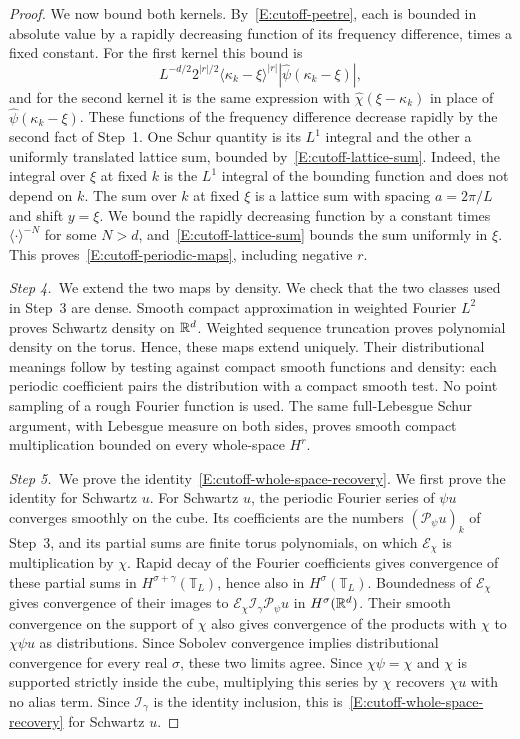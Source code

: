 \begin{proof}
  We now bound both kernels. By~\eqref{E:cutoff-peetre}, each is bounded in
  absolute value by a rapidly decreasing function of its frequency difference,
  times a fixed constant. For the first kernel this bound is
  \[
    L^{-d/2}2^{|r|/2}\langle\kappa_k-\xi\rangle^{|r|}
    \left|\widehat{\psi}(\kappa_k-\xi)\right|,
  \]
  and for the second kernel it is the same expression with
  $\widehat{\chi}(\xi-\kappa_k)$ in place of $\widehat{\psi}(\kappa_k-\xi)$.
  These functions of the frequency difference decrease rapidly by the second
  fact of Step~1. One Schur quantity is its $L^1$ integral and the other a
  uniformly translated lattice sum, bounded by~\eqref{E:cutoff-lattice-sum}.
  Indeed, the integral over $\xi$ at fixed $k$ is the $L^1$ integral of the
  bounding function and does not depend on $k$. The sum over $k$ at fixed
  $\xi$ is a lattice sum with spacing $a = 2\pi/L$ and shift $y = \xi$. We
  bound the rapidly decreasing function by a constant times
  $\langle\cdot\rangle^{-N}$ for some $N > d$,
  and~\eqref{E:cutoff-lattice-sum} bounds the sum uniformly in $\xi$. This
  proves~\eqref{E:cutoff-periodic-maps}, including negative $r$.

  \medskip
  \noindent\textit{Step 4.~}We extend the two maps by density. We check that
  the two classes used in
  Step~3 are dense. Smooth compact approximation in weighted Fourier $L^2$
  proves Schwartz density on $\mathbb{R}^d$. Weighted sequence truncation proves
  polynomial density on the torus. Hence, these maps extend uniquely. Their
  distributional meanings follow by testing against compact smooth functions
  and density: each periodic coefficient pairs the distribution with a compact
  smooth test. No point sampling of a rough Fourier function is used. The same
  full-Lebesgue Schur argument, with Lebesgue measure on both sides, proves
  smooth compact multiplication bounded on every whole-space $H^r$.

  \medskip
  \noindent\textit{Step 5.~}We prove the
  identity~\eqref{E:cutoff-whole-space-recovery}. We first
  prove the identity for Schwartz $u$. For Schwartz $u$, the periodic Fourier
  series of $\psi u$ converges smoothly on the cube. Its coefficients are the
  numbers $(\mathcal{P}_\psi u)_k$ of Step~3, and its partial sums are finite
  torus polynomials, on which $\mathcal{E}_\chi$ is multiplication by $\chi$.
  Rapid decay of the Fourier coefficients gives convergence of these partial
  sums in $H^{\sigma+\gamma}(\mathbb{T}_L)$, hence also in
  $H^\sigma(\mathbb{T}_L)$. Boundedness of $\mathcal{E}_\chi$ gives convergence
  of their images to $\mathcal{E}_\chi\mathcal{I}_\gamma\mathcal{P}_\psi u$
  in $H^\sigma(\mathbb{R}^d)$. Their smooth convergence on the support of $\chi$ also
  gives convergence of the products with $\chi$ to $\chi\psi u$ as
  distributions. Since Sobolev convergence implies distributional
  convergence for every real $\sigma$, these two limits agree.
  Since $\chi\psi = \chi$ and $\chi$ is supported strictly inside the cube,
  multiplying this series by $\chi$ recovers $\chi u$ with no alias term.
  Since $\mathcal{I}_\gamma$ is the identity inclusion, this
  is~\eqref{E:cutoff-whole-space-recovery} for Schwartz $u$.


\end{proof}
